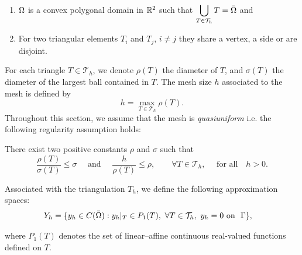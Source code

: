 \begin{assumption}\label{assupmtion_2}
~
\begin{enumerate}
    \item $\Omega$ is a convex polygonal domain in $\mathbb{R}^2$ such that 
	$\displaystyle \bigcup_{T\in\mathcal{T}_h} T=\bar{\Omega}$ and
	\item  For two triangular elements $T_i$ and $T_j$, $i\not=j$ they share a vertex, a side or are disjoint.
\end{enumerate}
\end{assumption}
For each triangle $T\in\mathcal{T}_h$, we denote  $\rho(T)$ the diameter of  $T$, and $\sigma(T)$ the diameter of the largest ball contained in $T$. The mesh size $h$ associated to the mesh is defined by
\[
\displaystyle h=\max_{T\in\mathcal{T}_h}\rho(T).
\]
Throughout this section, we assume that the mesh is \emph{quasiuniform} i.e.  the following regularity assumption holds: 
\begin{assumption}\label{assumption_3}
There exist two positive constants $\rho$ and $\sigma$ such that
\[\frac{\rho(T)}{\sigma(T)}\le \sigma\quad\text{ and }\quad\frac{h}{\rho(T)}\le \rho,\qquad\forall T\in\mathcal{T}_h, \quad \text{ for all}\quad h>0.\]
\end{assumption}
%
Associated with the triangulation $T_h$, we define the following approximation spaces:
\begin{align}
Y_h&=\{y_h\in C(\bar{\om}):y_h|_{T}\in P_1(T),\ \forall T\in\mathcal{T}_h,\ y_h=0\ \text{on }\ \Gamma\}, 
%
\end{align}



where $P_1(T)$ denotes the set of linear--affine  continuous real-valued functions defined on $T$.

